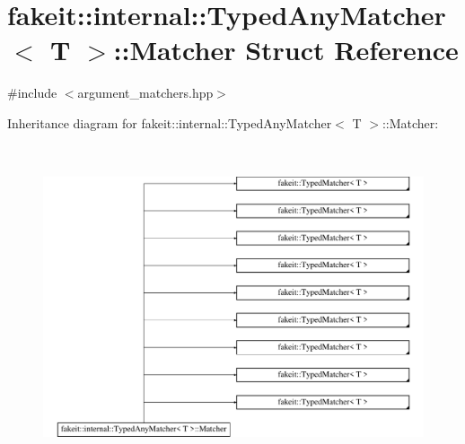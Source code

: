 \hypertarget{structfakeit_1_1internal_1_1TypedAnyMatcher_1_1Matcher}{}\section{fakeit\+::internal\+::Typed\+Any\+Matcher$<$ T $>$\+::Matcher Struct Reference}
\label{structfakeit_1_1internal_1_1TypedAnyMatcher_1_1Matcher}


{\ttfamily \#include $<$argument\+\_\+matchers.\+hpp$>$}

Inheritance diagram for fakeit\+::internal\+::Typed\+Any\+Matcher$<$ T $>$\+::Matcher\+:\begin{figure}[H]
\begin{center}
\leavevmode
\includegraphics[height=9.556314cm]{structfakeit_1_1internal_1_1TypedAnyMatcher_1_1Matcher}
\end{center}
\end{figure}
